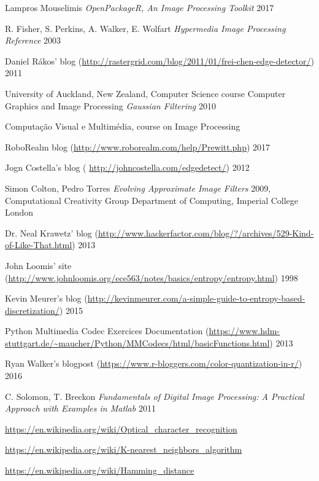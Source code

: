 \documentclass[12pt]{article}
\begin{document}
\begin{thebibliography}{1}

 Lampros Mouselimis {\em OpenPackageR, An Image Processing Toolkit} 2017

 R. Fisher, S. Perkins, A. Walker, E. Wolfart {\em Hypermedia Image Processing Reference} 2003

 Daniel R\'akos' blog (\url{http://rastergrid.com/blog/2011/01/frei-chen-edge-detector/}) 2011

 University of Auckland, New Zealand, Computer Science course Computer Graphics and Image Processing {\em Gaussian Filtering} 2010

 Computaç\~ao Visual e Multimédia, course on Image Processing

 RoboRealm blog (\url{http://www.roborealm.com/help/Prewitt.php}) 2017

 Jogn Costella's blog ( \url{http://johncostella.com/edgedetect/}) 2012

 Simon Colton, Pedro Torres {\em Evolving Approximate Image Filters} 2009, Computational Creativity Group
Department of Computing, Imperial College London

 Dr. Neal Krawetz' blog (\url{http://www.hackerfactor.com/blog/?/archives/529-Kind-of-Like-That.html}) 2013

 John Loomis' site (\url{http://www.johnloomis.org/ece563/notes/basics/entropy/entropy.html}) 1998

 Kevin Meurer's blog (\url{http://kevinmeurer.com/a-simple-guide-to-entropy-based-discretization/}) 2015

 Python Multimedia Codec Exercices Documentation (\url{https://www.hdm-stuttgart.de/~maucher/Python/MMCodecs/html/basicFunctions.html}) 2013

 Ryan Walker's blogpost (\url{https://www.r-bloggers.com/color-quantization-in-r/}) 2016

 C. Solomon, T. Breckon {\em Fundamentals of Digital Image Processing: A Practical Approach with Examples in Matlab} 2011

 \url{https://en.wikipedia.org/wiki/Optical_character_recognition}

 \url{https://en.wikipedia.org/wiki/K-nearest_neighbors_algorithm}

 \url{https://en.wikipedia.org/wiki/Hamming_distance}
\end{thebibliography}
\end{document}
